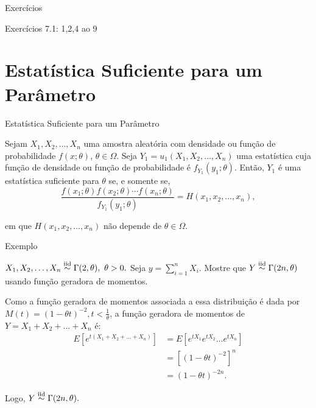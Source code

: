 \documentclass[12pt]{beamer}
\begin{document}
\begin{frame}{Exercícios}
\begin{block}{\Home}
\justifying
Exercícios 7.1: 1,2,4 ao 9
\end{block}
\end{frame}

\section{Estatística Suficiente para um Parâmetro}
\begin{frame}{Estatística Suficiente para um Parâmetro}
\begin{definicao}\label{def1}
\justifying
    Sejam $X_{1},X_{2}, \ldots , X_{n}$ uma amostra aleatória com densidade ou função de probabilidade $f(x; \theta)$, $\theta \in \Omega$. Seja $Y_{1} = u_{1}(X_{1},X_{2}, \ldots , X_{n})$ uma estatística cuja função de densidade ou função de probabilidade é $f_{Y_1}(y_1; \theta)$. Então, $Y_1$ é uma estatística suficiente para $\theta$ se, e somente se,
\begin{equation}
\dfrac{{f(x_1; \theta)f(x_2; \theta) \cdots f(x_n; \theta)}}{{f_{Y_1}(y_{1}; \theta)}} = H(x_1, x_2, \ldots , x_n),
\end{equation}

em que $H(x_1, x_2, \ldots , x_n)$ não depende de $\theta \in \Omega$.
\end{definicao}
\end{frame}

\begin{frame}{Exemplo}
\begin{block}{}
\justifying
$X_1,X_2, \ldots,X_n\overset{\text{iid}}{\sim} \Gamma(2,\theta),~\theta>0.$ Seja $y={\displaystyle \sum_{i=1}^{n}X_{i}}.$ Mostre que $Y\overset{\text{iid}}{\sim} \Gamma(2n,\theta)$ usando função geradora de momentos.
\end{block}
\pause
\begin{block}{}
\justifying
Como a função geradora de momentos associada a essa distribuição é dada por $M(t) = (1 - \theta t)^{-2}, t < \frac{1}{\theta}$, a função geradora de momentos de $Y= X_1 + X_2 + \ldots + X_n$ é:
\begin{align*}
E[e^{t(X_1+X_2+\ldots+X_n)}] &= E[e^{tX_1}e^{tX_2} \ldots e^{tX_n}] \\
&= [(1-\theta t)^{-2}]^n \\
&= (1 - \theta t)^{-2n}.
\end{align*}

Logo, $Y\overset{\text{iid}}{\sim} \Gamma(2n,\theta).$ 
\end{block}
\end{frame}
\end{document}
